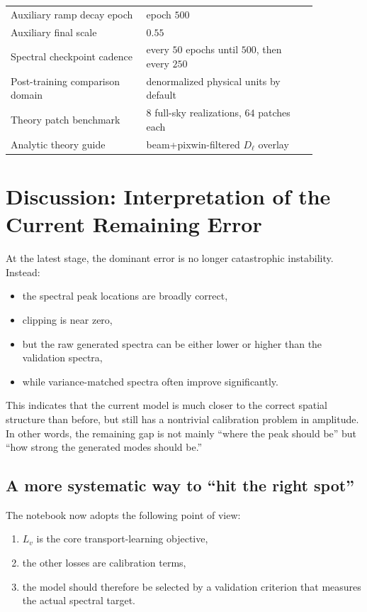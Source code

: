 \documentclass[11pt]{article}
\begin{document}
\begin{center}
\begin{tabular}{>{\raggedright\arraybackslash}p{0.38\linewidth}p{0.48\linewidth}}
Auxiliary ramp decay epoch & epoch \(500\) \\
Auxiliary final scale & \(0.55\) \\
Spectral checkpoint cadence & every \(50\) epochs until \(500\), then every \(250\) \\
Post-training comparison domain & denormalized physical units by default \\
Theory patch benchmark & \(8\) full-sky realizations, \(64\) patches each \\
Analytic theory guide & beam+pixwin-filtered \(D_\ell\) overlay \\
\bottomrule
\end{tabular}
\end{center}

\section{Discussion: Interpretation of the Current Remaining Error}

At the latest stage, the dominant error is no longer catastrophic instability. Instead:
\begin{itemize}[leftmargin=1.5em]
  \item the spectral peak locations are broadly correct,
  \item clipping is near zero,
  \item but the raw generated spectra can be either lower or higher than the validation spectra,
  \item while variance-matched spectra often improve significantly.
\end{itemize}

This indicates that the current model is much closer to the correct spatial structure than before, but still has a nontrivial calibration problem in amplitude. In other words, the remaining gap is not mainly ``where the peak should be'' but ``how strong the generated modes should be.''

\subsection{A more systematic way to ``hit the right spot''}

The notebook now adopts the following point of view:
\begin{enumerate}[leftmargin=1.5em]
  \item \(L_v\) is the core transport-learning objective,
  \item the other losses are calibration terms,
  \item the model should therefore be selected by a validation criterion that measures the actual spectral target.
\end{enumerate}
\end{document}
